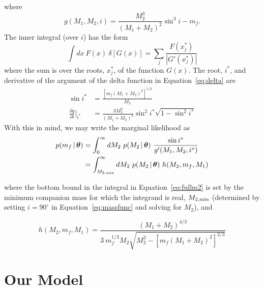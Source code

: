 \documentclass[letterpaper,12pt,preprint]{aastex}
\newcommand{\given}{\,|\,}
\newcommand{\bs}[1]{\boldsymbol{#1}}
\newcommand{\degree}{^{\circ}}
\begin{document}
where
\begin{equation}
	g(M_1,M_2,i) = \frac{M_2^3}{(M_1+M_2)^2}\sin^3 i - m_f.
\end{equation}
The inner integral (over $i$) has the form
\begin{equation}
    \int dx~F(x)~\delta \left[ G(x) \right] = \sum_j \frac{F(x^*_j)}{|G'(x^*_j)|}
\end{equation}
where the sum is over the roots, $x^*_j$, of the function $G(x)$. The root, $i^*$, and derivative of the argument of the delta function in Equation~\ref{eq:delta} are 
\begin{align}
	\sin i^* &= \frac{ \left[m_f(M_1+M_2)^2 \right]^{1/3}}{M_2}\\
	\frac{\partial g}{\partial i}\bigg\rvert_{i^*} &= \frac{3M_2^3}{(M_1+M_2)^2} \sin^2 i^* \sqrt{1 - \sin^2 i^*}
\end{align}
With this in mind, we may write the marginal likelihood as
\begin{align}
	p(m_f \given \bs{\theta}) &= \int_{0}^\infty dM_2~p(M_2 \given \bs{\theta})~\frac{\sin i^*}{g'(M_1,M_2,i^*)}\\
	&= \int_{M_{2,{\rm min}}}^\infty dM_2~p(M_2 \given \bs{\theta})~h(M_2, m_f, M_1) \label{eq:fullm2}
\end{align}

where the bottom bound in the integral in Equation~\ref{eq:fullm2} is set by the minimum companion mass for which the integrand is real, $M_{2,{\rm min}}$ (determined by setting $i=90\degree$ in Equation~\ref{eq:massfunc} and solving for $M_2$), and

\begin{equation}
h(M_2, m_f, M_1) = \frac{(M_1+M_2)^{4/3}}{3\ m_f^{1/3}M_2\sqrt{M_2^2 - \left[ m_f(M_1+M_2)^2 \right]^{2/3}}}
\end{equation}






\section{Our Model} \label{sec:experiments}
\end{document}
